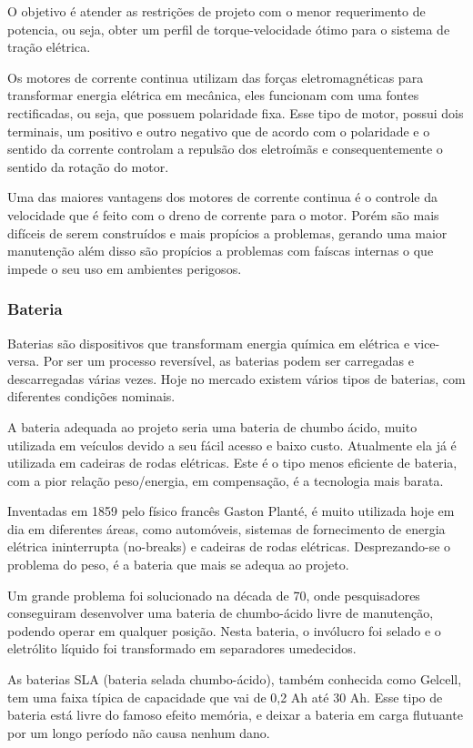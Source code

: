   O objetivo é atender as restrições de projeto com o menor requerimento de potencia, ou seja, obter um perfil de torque-velocidade ótimo para o sistema de tração elétrica.

  Os motores de corrente continua utilizam das forças eletromagnéticas para transformar energia elétrica em mecânica, eles funcionam com uma fontes rectificadas, ou seja, que possuem polaridade fixa. Esse tipo de motor, possui dois terminais, um positivo e outro negativo que de acordo com o polaridade e o sentido da corrente controlam a repulsão dos eletroímãs e consequentemente o sentido da rotação do motor.

  Uma das maiores vantagens dos motores de corrente continua é o controle da velocidade que é feito com o dreno de corrente para o motor. Porém são mais difíceis de serem construídos e mais propícios a problemas, gerando uma maior manutenção além disso são propícios a problemas com faíscas internas o que impede o seu uso em ambientes perigosos.


 \subsubsection{Bateria}
  Baterias são dispositivos que transformam energia química em elétrica e vice-versa. Por ser um processo reversível, as baterias podem ser carregadas e descarregadas várias vezes. Hoje no mercado existem vários tipos de baterias, com diferentes condições nominais.

  A bateria adequada ao projeto seria uma bateria de chumbo ácido, muito utilizada em veículos devido a seu fácil acesso e baixo custo. Atualmente ela já é utilizada em cadeiras de rodas elétricas. Este é o tipo menos eficiente de bateria, com a pior relação peso/energia, em compensação, é a tecnologia mais barata.

    Inventadas em 1859 pelo físico francês Gaston Planté, é muito utilizada hoje em dia em diferentes áreas, como automóveis, sistemas de fornecimento de energia elétrica ininterrupta (no-breaks) e cadeiras de rodas elétricas. Desprezando-se o problema do peso, é a bateria que mais se adequa ao projeto.

    Um grande problema foi solucionado na década de 70, onde pesquisadores conseguiram desenvolver uma bateria de chumbo-ácido livre de manutenção, podendo operar em qualquer posição. Nesta bateria, o invólucro foi selado e o eletrólito líquido foi transformado em separadores umedecidos.

    As baterias SLA (bateria selada chumbo-ácido), também conhecida como Gelcell, tem uma faixa típica de capacidade que vai de 0,2 Ah até 30 Ah. Esse tipo de bateria está livre do famoso efeito memória, e deixar a bateria em carga flutuante por um longo período não causa nenhum dano.

